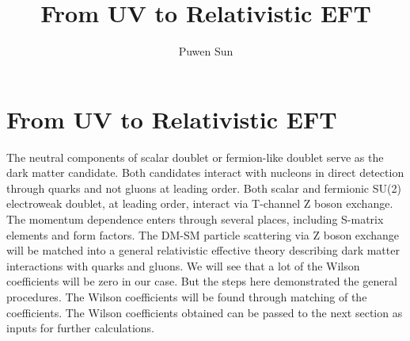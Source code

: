 \documentclass[12pt]{article}
\begin{document}
\title{From UV to Relativistic EFT}
\author{Puwen Sun}
\date{}
\maketitle


\section{From UV to Relativistic EFT}

The neutral components of scalar doublet or fermion-like doublet serve as the dark matter candidate. Both candidates interact with nucleons in direct detection through quarks and not gluons at leading order. 
Both scalar and fermionic SU(2) electroweak doublet, at leading order, interact via T-channel Z boson exchange. The momentum dependence enters through several places, including S-matrix elements and form factors. 
The DM-SM particle scattering via Z boson exchange will be matched into a general relativistic effective theory describing dark matter interactions with quarks and gluons. We will see that a lot of the Wilson coefficients will be zero in our case. But the steps here demonstrated the general procedures. The Wilson coefficients will be found through matching of the coefficients. The Wilson coefficients obtained can be passed to the next section as inputs for further calculations. 
\end{document}
